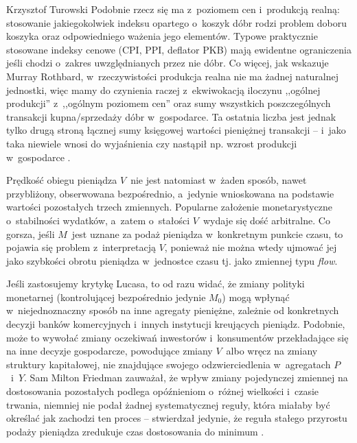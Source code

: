 \begin{artplenv}{Krzysztof Turowski}
Podobnie rzecz się ma z~poziomem cen i~produkcją realną: stosowanie jakiegokolwiek indeksu opartego o~koszyk dóbr rodzi
problem doboru koszyka oraz odpowiedniego ważenia jego elementów. Typowe praktycznie stosowane indeksy cenowe (CPI,
PPI, deflator PKB) mają ewidentne ograniczenia jeśli chodzi o~zakres uwzględnianych przez nie dóbr. Co więcej, jak
wskazuje Murray Rothbard, w~rzeczywistości produkcja realna nie ma żadnej naturalnej jednostki, więc mamy do czynienia
raczej z~ekwiwokacją iloczynu ,,ogólnej produkcji'' z~,,ogólnym poziomem cen'' oraz sumy wszystkich poszczególnych
transakcji kupna/sprzedaży dóbr w~gospodarce. Ta ostatnia liczba jest jednak tylko drugą stroną łącznej sumy księgowej
wartości pieniężnej transakcji  --  i~jako taka niewiele wnosi do wyjaśnienia czy nastąpił np. wzrost
produkcji w~gospodarce
\parencite{rothbard_man_1962}.

Prędkość obiegu pieniądza $V$~nie jest natomiast w~żaden sposób, nawet przybliżony, obserwowana
bezpośrednio, a~jedynie wnioskowana na podstawie wartości pozostałych trzech zmiennych. Popularne założenie
monetarystyczne o~stabilności wydatków, a~zatem o~stałości $V$~wydaje się dość arbitralne. Co gorsza, jeśli $M$~jest uznane
za podaż pieniądza w~konkretnym punkcie czasu, to pojawia się problem z~interpretacją $V$, ponieważ nie można
wtedy ujmować jej jako szybkości obrotu pieniądza w~jednostce czasu tj. jako zmiennej typu \textit{flow}.

Jeśli zastosujemy krytykę Lucasa, to od razu widać, że zmiany polityki monetarnej (kontrolującej bezpośrednio jedynie
$M_0$) mogą wpłynąć w~niejednoznaczny sposób na inne agregaty pieniężne, zależnie od
konkretnych decyzji banków komercyjnych i~innych instytucji kreujących pieniądz. Podobnie, może to wywołać zmiany
oczekiwań inwestorów i~konsumentów przekładające się na inne decyzje gospodarcze, powodujące zmiany $V$~albo
wręcz na zmiany struktury kapitałowej, nie znajdujące swojego odzwierciedlenia w~agregatach $P$~i~$Y$.
Sam Milton Friedman zauważał, że wpływ zmiany pojedynczej zmiennej na dostosowania pozostałych podlega
opóźnieniom o~różnej wielkości i~czasie trwania, niemniej nie podał żadnej systematycznej reguły, która miałaby być określać jak
zachodzi ten proces  --  stwierdzał jedynie, że reguła stałego przyrostu podaży pieniądza zredukuje czas
dostosowania do minimum
\parencite{friedman_counter-revolution_1996}.


\end{artplenv}
